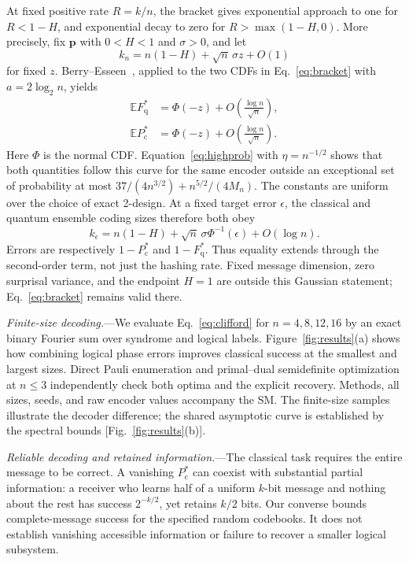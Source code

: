 \documentclass[aps,prl,reprint,superscriptaddress,amsmath,amssymb]{revtex4-2}
\newcommand{\E}{\mathbb E}
\newcommand{\Pc}{P_{\mathrm c}^{*}}
\newcommand{\Fq}{F_{\mathrm q}^{*}}
\begin{document}
At fixed positive rate $R=k/n$, the bracket gives exponential approach to
one for $R<1-H$, and exponential decay to zero for
$R>\max(1-H,0)$. More precisely, fix $\bm p$ with $0<H<1$ and $\sigma>0$, and let
\begin{equation}
k_n=n(1-H)+\sqrt n\,\sigma z+O(1)
\label{eq:window}
\end{equation}
for fixed $z$. Berry--Esseen~\cite{Feller}, applied to the two CDFs in
Eq.~\eqref{eq:bracket} with $a=2\log_2n$, yields
\begin{equation}
\boxed{\begin{aligned}
\E\Fq&=\Phi(-z)+O\!\left(\frac{\log n}{\sqrt n}\right),\\
\E\Pc&=\Phi(-z)+O\!\left(\frac{\log n}{\sqrt n}\right).
\end{aligned}}
\label{eq:gaussian}
\end{equation}
Here $\Phi$ is the normal CDF. Equation~\eqref{eq:highprob} with
$\eta=n^{-1/2}$ shows that both quantities follow this curve for the same
encoder outside an exceptional set of probability at most
$37/(4n^{3/2})+n^{5/2}/(4M_n)$. The constants are uniform over the choice of
exact 2-design. At a fixed target error $\epsilon$, the classical and quantum
ensemble coding sizes therefore both obey
\begin{equation}
k_\epsilon=n(1-H)+\sqrt n\,\sigma\Phi^{-1}(\epsilon)+O(\log n).
\label{eq:dispersion}
\end{equation}
Errors are respectively $1-\Pc$ and $1-\Fq$. Thus equality extends through
the second-order term, not just the hashing rate. Fixed message dimension,
zero surprisal variance, and the endpoint $H=1$ are outside this Gaussian
statement; Eq.~\eqref{eq:bracket} remains valid there.

\emph{Finite-size decoding.}---We evaluate Eq.~\eqref{eq:clifford} for
$n=4,8,12,16$ by an exact binary Fourier sum over syndrome and logical labels.
Figure~\ref{fig:results}(a) shows how combining logical phase errors improves
classical success at the smallest and largest sizes. Direct Pauli enumeration
and primal--dual semidefinite optimization at $n\le3$ independently check
both optima and the explicit recovery. Methods, all sizes, seeds, and raw
encoder values accompany the SM. The finite-size samples illustrate the
decoder difference; the shared asymptotic curve is established by the spectral
bounds [Fig.~\ref{fig:results}(b)].

\emph{Reliable decoding and retained information.}---The classical task
requires the entire message to be correct. A vanishing $\Pc$ can coexist
with substantial partial information: a receiver who learns half of a
uniform $k$-bit message and nothing about the rest has success $2^{-k/2}$,
yet retains $k/2$ bits. Our converse bounds complete-message success for the
specified random codebooks. It does not establish vanishing accessible
information or failure to recover a smaller logical subsystem.
\end{document}
